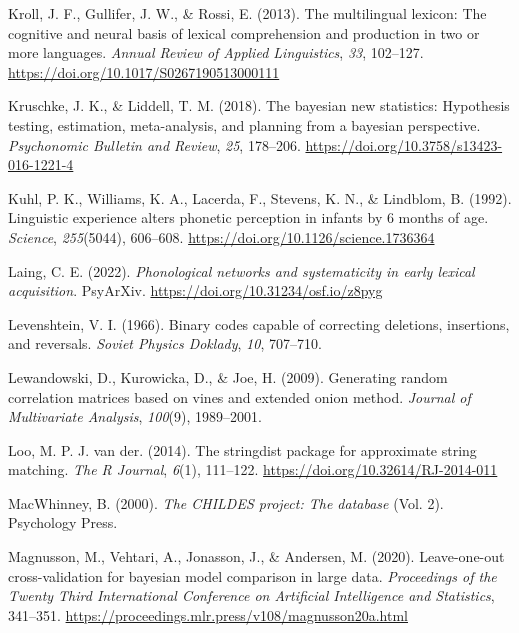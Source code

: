 \documentclass[
  man,
  floatsintext,
  colorlinks=true,linkcolor=blue,citecolor=blue,urlcolor=blue,biblatex]{apa7}
\newlength{\cslhangindent}
\newlength{\cslentryspacingunit} %
\newenvironment{CSLReferences}[2] %
 {%
  \setlength{\parindent}{0pt}
  \ifodd #1
  \let\oldpar\par
  \def\par{\hangindent=\cslhangindent\oldpar}
  \fi
  \setlength{\parskip}{#2\cslentryspacingunit}
 }%
 {}
\begin{document}
\begin{CSLReferences}{1}{0}
\leavevmode{}%
Kroll, J. F., Gullifer, J. W., \& Rossi, E. (2013). The multilingual
lexicon: The cognitive and neural basis of lexical comprehension and
production in two or more languages. \emph{Annual Review of Applied
Linguistics}, \emph{33}, 102--127.
\url{https://doi.org/10.1017/S0267190513000111}

\leavevmode{}%
Kruschke, J. K., \& Liddell, T. M. (2018). The bayesian new statistics:
Hypothesis testing, estimation, meta-analysis, and planning from a
bayesian perspective. \emph{Psychonomic Bulletin and Review}, \emph{25},
178--206. \url{https://doi.org/10.3758/s13423-016-1221-4}

\leavevmode{}%
Kuhl, P. K., Williams, K. A., Lacerda, F., Stevens, K. N., \& Lindblom,
B. (1992). Linguistic experience alters phonetic perception in infants
by 6 months of age. \emph{Science}, \emph{255}(5044), 606--608.
\url{https://doi.org/10.1126/science.1736364}

\leavevmode{}%
Laing, C. E. (2022). \emph{Phonological networks and systematicity in
early lexical acquisition}. {PsyArXiv}.
\url{https://doi.org/10.31234/osf.io/z8pyg}

\leavevmode{}%
Levenshtein, V. I. (1966). Binary codes capable of correcting deletions,
insertions, and reversals. \emph{Soviet Physics Doklady}, \emph{10},
707--710.

\leavevmode{}%
Lewandowski, D., Kurowicka, D., \& Joe, H. (2009). Generating random
correlation matrices based on vines and extended onion method.
\emph{Journal of Multivariate Analysis}, \emph{100}(9), 1989--2001.

\leavevmode{}%
Loo, M. P. J. van der. (2014). The stringdist package for approximate
string matching. \emph{The R Journal}, \emph{6}(1), 111--122.
\url{https://doi.org/10.32614/RJ-2014-011}

\leavevmode{}%
MacWhinney, B. (2000). \emph{The {CHILDES} project: The database} (Vol.
2). Psychology Press.

\leavevmode{}%
Magnusson, M., Vehtari, A., Jonasson, J., \& Andersen, M. (2020).
Leave-one-out cross-validation for bayesian model comparison in large
data. \emph{Proceedings of the Twenty Third International Conference on
Artificial Intelligence and Statistics}, 341--351.
\url{https://proceedings.mlr.press/v108/magnusson20a.html}


\end{CSLReferences}
\end{document}
